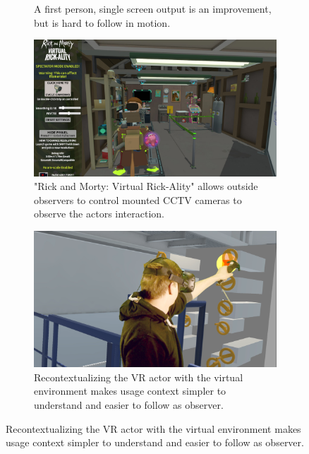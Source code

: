 \begin{figure}[htbp]
\begin{subfigure}[t]{.45\textwidth}
		\caption{A first person, single screen output is an improvement, but is 
			hard to follow in motion.}
	\end{subfigure}
	\begin{subfigure}[t]{.45\textwidth}
		\includegraphics[width=\textwidth]{gfx/evolution/cctv.png}
		\caption{"Rick and Morty: Virtual Rick-Ality" allows outside observers 
			to control mounted CCTV cameras to observe the actors interaction.}
	\end{subfigure}
	\begin{subfigure}[t]{.45\textwidth}
		\includegraphics[width=\textwidth]{gfx/evolution/mr-action.png}
		\caption{Recontextualizing the VR actor with the virtual environment 
		makes usage context simpler to understand and easier to follow as 
		observer.}
	\end{subfigure}
\end{figure}

